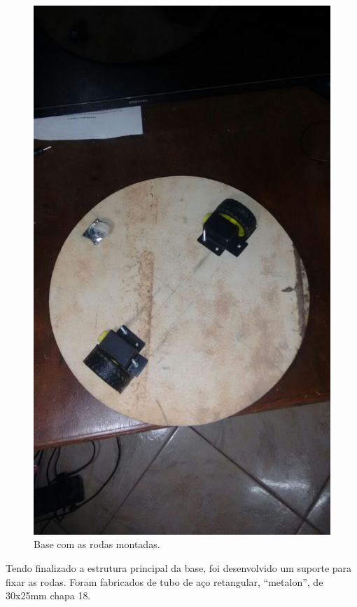 \begin{figure}[H]
	\centering
	\includegraphics[scale=0.3]{figuras/serra_tico_tico.png}
	\caption{Base com as rodas montadas.}
	\label{img:serra_tico_tico}
\end{figure}

Tendo finalizado a estrutura principal da base, foi desenvolvido um suporte para fixar as rodas. Foram fabricados de tubo de aço retangular, “metalon”, de 30x25mm chapa 18. 

